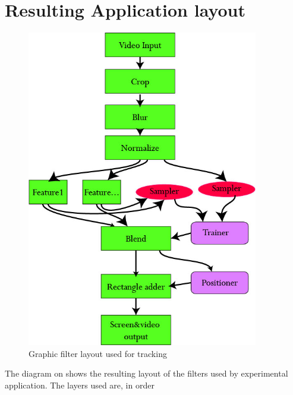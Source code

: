 \section{Resulting Application layout}
\begin{figure}[t]
		\centering
		\includegraphics[width=0.9\textwidth]{tracking}
		\caption{Graphic filter layout used for tracking}
		\label{tracking}
	\end{figure}
The diagram on  shows the resulting layout of the filters used by experimental application. The layers used are, in order
